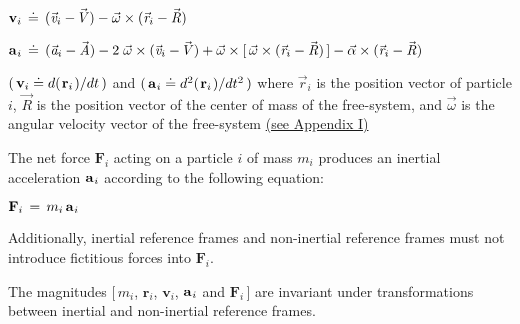 \documentclass[10pt]{article}
\begin{document}
\par \bigskip ${\mathbf{v}}_i \,\doteq\, ({\vec{\mathit{v}}}_i - \hspace{-0.120em}{\vec{\mathit{V}}}) - {\vec{\omega}} \times ({\vec{\mathit{r}}}_i - {\vec{\mathit{R}}})$

\par \bigskip ${\mathbf{a}}_{\hspace{+0.045em}i} \,\doteq\, ({\vec{\mathit{a}}}_i - {\vec{\mathit{A}}}) - 2 \; {\vec{\omega}} \times ({\vec{\mathit{v}}}_i - \hspace{-0.120em}{\vec{\mathit{V}}}) + {\vec{\omega}} \times [ \, {\vec{\omega}} \times ({\vec{\mathit{r}}}_i - {\vec{\mathit{R}}}) \, ] - {\vec{\alpha}} \times ({\vec{\mathit{r}}}_i - {\vec{\mathit{R}}})$

\par \bigskip\smallskip \noindent $( \, {\mathbf{v}}_i \doteq d(\hspace{+0.090em}{\mathbf{r}}_i\hspace{+0.090em})/dt \, )$ and $( \, {\mathbf{a}}_{\hspace{+0.045em}i} \doteq d^2(\hspace{+0.090em}{\mathbf{r}}_i\hspace{+0.090em})/dt^2 \, )$ where ${\vec{\mathit{r}}}_i$ is the position vector of particle $i$, ${\vec{\mathit{R}}}$ is the position vector of the center of mass of the free-system, and ${\vec{\omega}}$ is the angular velocity vector of the free-system \hyperlink{p3a1}{(\hspace{+0.120em}see Appendix I\hspace{+0.120em})}

\par \bigskip \noindent The net force ${\mathbf{F}}_i$ acting on a particle $i$ of mass $m_i$ produces an inertial acceleration ${\mathbf{a}}_{\hspace{+0.045em}i}$ according to the following equation:

\par \bigskip\smallskip ${\mathbf{F}}_i \,=\, m_i \, {\mathbf{a}}_{\hspace{+0.045em}i}$

\par \bigskip\smallskip \noindent Additionally, inertial reference frames and non-inertial reference frames must not introduce fictitious forces into ${\mathbf{F}}_i$.

\par \bigskip \noindent The magnitudes $[ \, {\mathit{m}}_i$, ${\mathbf{r}}_i$, ${\mathbf{v}}_i$, ${\mathbf{a}}_{\hspace{+0.045em}i}$ and ${\mathbf{F}}_i \, ]$ are invariant under transformations between inertial and non-inertial reference frames.
\end{document}
